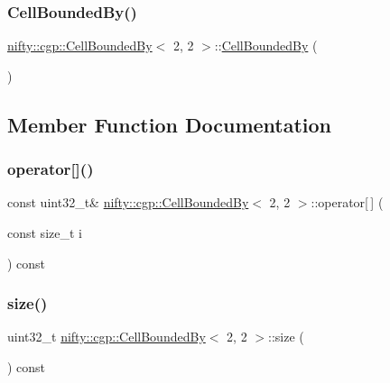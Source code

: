 \subsubsection{\texorpdfstring{Cell\+Bounded\+By()}{CellBoundedBy()}}
{\footnotesize\ttfamily \hyperlink{classnifty_1_1cgp_1_1CellBoundedBy}{nifty\+::cgp\+::\+Cell\+Bounded\+By}$<$ 2, 2 $>$\+::\hyperlink{classnifty_1_1cgp_1_1CellBoundedBy}{Cell\+Bounded\+By} (\begin{DoxyParamCaption}{ }\end{DoxyParamCaption})\hspace{0.3cm}{\ttfamily [inline]}}



\subsection{Member Function Documentation}
\mbox{\label{classnifty_1_1cgp_1_1CellBoundedBy_3_012_00_012_01_4_acde63a1f0ca2b9f0a55b5d71487c7f14}} 
\subsubsection{\texorpdfstring{operator[]()}{operator[]()}}
{\footnotesize\ttfamily const uint32\+\_\+t\& \hyperlink{classnifty_1_1cgp_1_1CellBoundedBy}{nifty\+::cgp\+::\+Cell\+Bounded\+By}$<$ 2, 2 $>$\+::operator\mbox{[}$\,$\mbox{]} (\begin{DoxyParamCaption}\item[{const size\+\_\+t}]{i }\end{DoxyParamCaption}) const\hspace{0.3cm}{\ttfamily [inline]}}

\mbox{\label{classnifty_1_1cgp_1_1CellBoundedBy_3_012_00_012_01_4_acfede2965ebce20b047084af806ceaeb}} 
\subsubsection{\texorpdfstring{size()}{size()}}
{\footnotesize\ttfamily uint32\+\_\+t \hyperlink{classnifty_1_1cgp_1_1CellBoundedBy}{nifty\+::cgp\+::\+Cell\+Bounded\+By}$<$ 2, 2 $>$\+::size (\begin{DoxyParamCaption}{ }\end{DoxyParamCaption}) const\hspace{0.3cm}{\ttfamily [inline]}}




